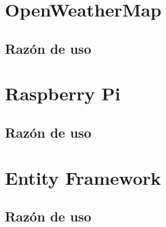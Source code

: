 

\section{OpenWeatherMap}

\subsection{Razón de uso}

\section{Raspberry Pi}

\subsection{Razón de uso}

\section{Entity Framework}

\subsection{Razón de uso}